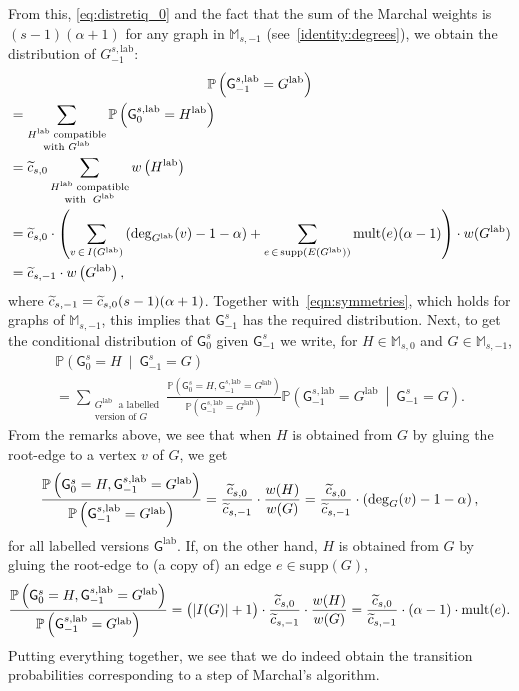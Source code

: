 \documentclass[10pt]{amsart}
\theoremstyle{definition}\newtheorem{defi}[theo]{Definition}\newtheorem{rema}[theo]{Remark}\newtheorem{exam}[theo]{Example}\newtheorem{exem}[theo]{Example}\newtheorem{nota}[theo]{Notation}
\newcommand{\Pp}[1]{\mathbb{P} \left(#1\right)}
\newcommand{\supp}{\mathrm{supp}}
\newcommand{\lab}{\mathrm{lab}}
\newcommand{\mult}{\mathrm{mult}}
\newcommand{\sG}{\mathsf{G}}
\newcommand{\M}{\mathbb{M}}
\let\oldtilde\tilde
\renewcommand*{\tilde}[1]{\mathchoice{\widetilde{#1}}{\widetilde{#1}}{\oldtilde{#1}}{\oldtilde{#1}}}
\begin{document}
From this, \eqref{eq:distretiq_0} and the fact that the sum of the Marchal weights is $(s-1)(\alpha+1)$ for any graph in $\M_{s,-1}$ (see~\eqref{identity:degrees}), we obtain the distribution of $G_{-1}^{s,\lab}$:
\begin{multline*}
\Pp{\sG_{-1}^{s,\lab}=G^{\lab}}\\
\begin{aligned}
&=\sum_{\substack{H^{\lab}\; \text{compatible} \\ \text{with }G^{\lab}}} \Pp{\sG_{0}^{s,\lab}=H^{\lab}} \\
& = \tilde{c}_{s,0}\sum_{\substack{H^{\lab}\; \text{compatible} \\ \text{with }\;G^{\lab}}} w\left(H^{\lab}\right) \\
&= \tilde{c}_{s,0} \cdot \left(\sum_{v\,\in\, I\left(G^{\lab}\right)} \left(\deg_{G^{\lab}}(v)-1-\alpha\right) + \sum_{e\,\in\,\supp\left(E\left(G^{\lab}\right)\right)} \mult(e)(\alpha-1) \right) \cdot w(G^{\lab}) \\
&= \tilde{c}_{s,-1} \cdot w\left(G^{\lab}\right),
\end{aligned}
\end{multline*}
where $\tilde{c}_{s,-1}=\tilde{c}_{s,0}(s-1)(\alpha+1)$. Together with~\eqref{eqn:symmetries}, which holds for graphs of $\M_{s,-1}$, this implies that $\sG_{-1}^s$ has the required distribution. Next, to get the conditional distribution of $\sG^s_0$ given $\sG^s_{-1}$ we write, for $H \in \M_{s,0}$ and $G \in \M_{s,-1}$,
\begin{multline*}
\Pp{\sG^s_0 =H \ \middle| \ \sG^s_{-1} =G}\\
 = \sum_{\substack{G^{\lab}\;\text{ a labelled} \\ \text{version of $G$}}} \frac{\Pp{\sG^s_0 =H, \sG^{s,\lab}_{-1} =G^{\lab}}}{\Pp {\sG^{s,\lab}_{-1} =G^{\lab}}} \Pp{\sG^{s,\lab}_{-1} =G^{\lab} \ \middle| \ \sG^s_{-1} =G}.
\end{multline*}
From the remarks above, we see that when $H$ is obtained from $G$ by gluing the root-edge to a vertex $v$ of $G$, we get
\[
\frac{\Pp{\sG^s_0 =H, \sG^{s,\lab}_{-1} =G^{\lab}}}{\Pp{ \sG^{s,\lab}_{-1} =G^{\lab}}} = \frac{\tilde{c}_{s,0}}{\tilde{c}_{s,-1}} \cdot \frac{w(H)}{w(G)}=\frac{\tilde{c}_{s,0}}{\tilde{c}_{s,-1}} \cdot \left(\deg_G(v)-1-\alpha\right),
\]
for all labelled versions $\sG^{\lab}$. If, on the other hand, $H$ is obtained from $G$ by gluing the root-edge to (a copy of) an edge $e \in \supp(G)$,
\[
\frac{\Pp{\sG^s_0 =H, \sG^{s,\lab}_{-1} =G^{\lab}}}{\Pp{ \sG^{s,\lab}_{-1} =G^{\lab}}} =\big(|I(G)|+1\big) \cdot \frac{\tilde{c}_{s,0}}{\tilde{c}_{s,-1}} \cdot \frac{w(H)}{w(G)}=\frac{\tilde{c}_{s,0}}{\tilde{c}_{s,-1}} \cdot (\alpha-1) \cdot \mult(e).
\]
Putting everything together, we see that we do indeed obtain the transition probabilities corresponding to a step of Marchal's algorithm.
\end{document}
